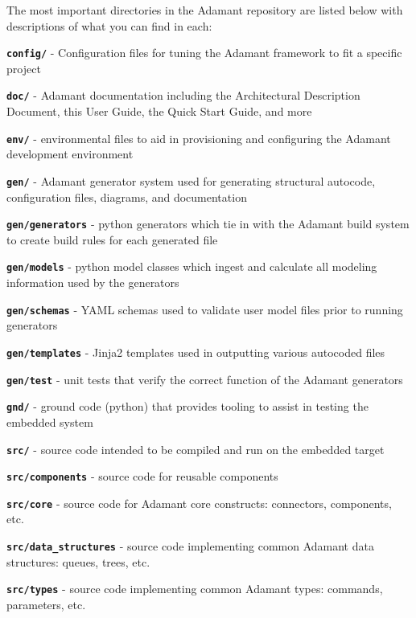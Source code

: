 The most important directories in the Adamant repository are listed below with descriptions of what you can find in each:

\vspace{5mm} %
\begin{spaceditemize}
  \item \textbf{\texttt{config/}} - Configuration files for tuning the Adamant framework to fit a specific project
  \item \textbf{\texttt{doc/}} - Adamant documentation including the Architectural Description Document, this User Guide, the Quick Start Guide, and more
  \item \textbf{\texttt{env/}} - environmental files to aid in provisioning and configuring the Adamant development environment
  \item \textbf{\texttt{gen/}} - Adamant generator system used for generating structural autocode, configuration files, diagrams, and documentation 
  \item \textbf{\texttt{gen/generators}} - python generators which tie in with the Adamant build system to create build rules for each generated file
  \item \textbf{\texttt{gen/models}} - python model classes which ingest and calculate all modeling information used by the generators
  \item \textbf{\texttt{gen/schemas}} - YAML schemas used to validate user model files prior to running generators 
  \item \textbf{\texttt{gen/templates}} - Jinja2 templates used in outputting various autocoded files
  \item \textbf{\texttt{gen/test}} - unit tests that verify the correct function of the Adamant generators
  \item \textbf{\texttt{gnd/}} - ground code (python) that provides tooling to assist in testing the embedded system
  \item \textbf{\texttt{src/}} - source code intended to be compiled and run on the embedded target
  \item \textbf{\texttt{src/components}} - source code for reusable components
  \item \textbf{\texttt{src/core}} - source code for Adamant core constructs: connectors, components, etc.
  \item \textbf{\texttt{src/data\_structures}} - source code implementing common Adamant data structures: queues, trees, etc.
  \item \textbf{\texttt{src/types}} - source code implementing common Adamant types: commands, parameters, etc.

\end{spaceditemize}
